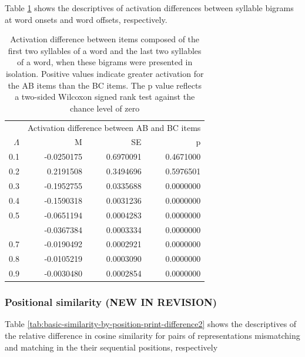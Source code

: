\documentclass[
]{article}
\begin{document}
Table
\ref{tab:basic-experiment-global-print-difference-between-parts-of-word2}
shows the descriptives of activation differences between syllable
bigrams at word onsets and word offsets, respectively.

\begin{table}

\caption{\label{tab:basic-experiment-global-print-difference-between-parts-of-word2}Activation difference between items composed of the first two syllables of a word and the last two syllables of a word, when these bigrams were presented in isolation. Positive values indicate greater activation for the AB items than the BC items. The p value reflects a two-sided Wilcoxon signed rank test against the chance level of zero}
\centering
\begin{tabular}[t]{rrrr}
\toprule
\multicolumn{1}{c}{ } & \multicolumn{3}{c}{Activation difference between AB and BC items} \\
\cmidrule(l{3pt}r{3pt}){2-4}
$\Lambda$ & M & SE & p\\
\midrule
0.1 & -0.0250175 & 0.6970091 & 0.4671000\\
0.2 & 0.2191508 & 0.3494696 & 0.5976501\\
0.3 & -0.1952755 & 0.0335688 & 0.0000000\\
0.4 & -0.1590318 & 0.0031236 & 0.0000000\\
0.5 & -0.0651194 & 0.0004283 & 0.0000000\\
\addlinespace
0.6 & -0.0367384 & 0.0003334 & 0.0000000\\
0.7 & -0.0190492 & 0.0002921 & 0.0000000\\
0.8 & -0.0105219 & 0.0003090 & 0.0000000\\
0.9 & -0.0030480 & 0.0002854 & 0.0000000\\
\bottomrule
\end{tabular}
\end{table}

\hypertarget{positional-similarity-new-in-revision}{%
\subsubsection{Positional similarity (NEW IN
REVISION)}\label{positional-similarity-new-in-revision}}

Table \ref{tab:basic-similarity-by-position-print-difference2} shows the
descriptives of the relative difference in cosine similarity for pairs
of representations mismatching and matching in the their sequential
positions, respectively
\end{document}
